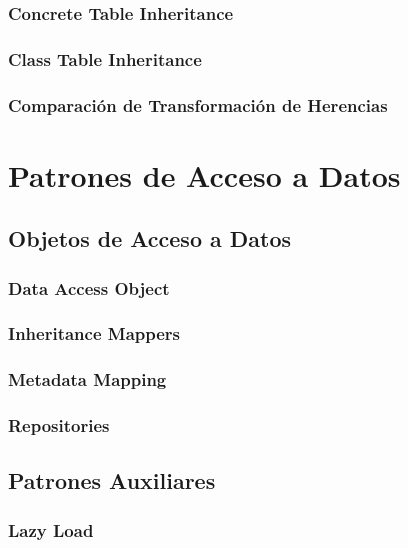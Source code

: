 \documentclass[a4paper,slidestop,xcolor=pst,blue]{beamer}
\begin{document}
\subsubsection{Concrete Table Inheritance}

\subsubsection{Class Table Inheritance}

\subsubsection{Comparación de Transformación de Herencias}

\section{Patrones de Acceso a Datos}

\subsection{Objetos de Acceso a Datos}

\subsubsection{Data Access Object}

\subsubsection{Inheritance Mappers}

\subsubsection{Metadata Mapping}

\subsubsection{Repositories}

\subsection{Patrones Auxiliares}

\subsubsection{Lazy Load}
\end{document}
